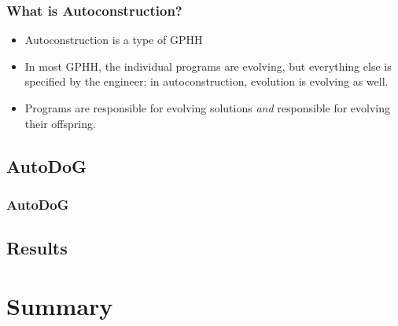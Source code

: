 \documentclass{beamer}
\newcommand{\linespace}{\vskip 0.25cm}
\begin{document}
\begin{frame}
	\frametitle{What is Autoconstruction?}
	\begin{itemize}
		\item Autoconstruction is a type of GPHH
		\linespace
		\pause
		\item In most GPHH, the individual programs are evolving, but everything else is specified by the engineer; in autoconstruction, evolution is evolving as well.
		\linespace
		\pause
		\item Programs are responsible for evolving solutions \textit{and} responsible for evolving their offspring.
	\end{itemize}
\end{frame}

\subsection{AutoDoG}

\begin{frame}
	\frametitle{AutoDoG}
\end{frame}

\subsection{Results}

\section[Summary]{Summary}
\end{document}
